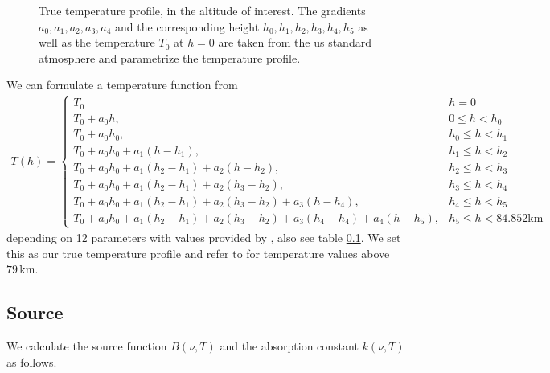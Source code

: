 \begin{figure}[ht!]
	\centering
	\caption{True temperature profile, in the altitude of interest.
		The gradients $a_0,a_1,a_2,a_3,a_4$ and the corresponding height $h_0,h_1,h_2,h_3,h_4,h_5$ as well as the temperature $T_0$ at $h = 0$ are taken from the us standard atmosphere and parametrize the temperature profile.}
	\label{fig:nter-label}
\end{figure}
We can formulate a temperature function from \cite{atmosphere1976us}
\begin{align}
	T(h) = \begin{cases*}
		T_0 & \text{$h = 0$}\\
		T_0 + a_0 h, & \text{$0 \leq h < h_{0}$}\\
		T_0 + a_0 h_0, & \text{$h_{0} \leq  h < h_{1}$}\\
		T_0 + a_0 h_0 + a_1 (h -h_1) , & \text{$h_{1} \leq h < h_{2}$}\\
		T_0 + a_0 h_0 + a_1 (h_2 - h_1) + a_2 (h - h_2), & \text{$h_{2} \leq h < h_{3}$}\\
		T_0 + a_0 h_0 + a_1 (h_2 - h_1) + a_2 (h_3 - h_2), & \text{$h_{3} \leq h < h_{4}$}\\
		T_0 + a_0 h_0 + a_1 (h_2 - h_1) + a_2 (h_3 - h_2) + a_3 (h -h_4), & \text{$h_{4} \leq h < h_{5}$}\\
		T_0 + a_0 h_0 + a_1 (h_2 - h_1) + a_2 (h_3 - h_2) + a_3 (h_4 - h_4) + a_4 (h -h_5), & \text{$h_{5} \leq h < 84.852\text{km}$}
	\end{cases*} 
\end{align}
depending on 12 parameters with values provided by \cite{}, also see table \ref{}.
We set this as our true temperature profile and refer to \cite{} for temperature values above $79 \,\text{km}$.


\subsection{Source}
We calculate the source function $B(\nu, T)$ and the absorption constant $ k(\nu, T)$ as follows.

